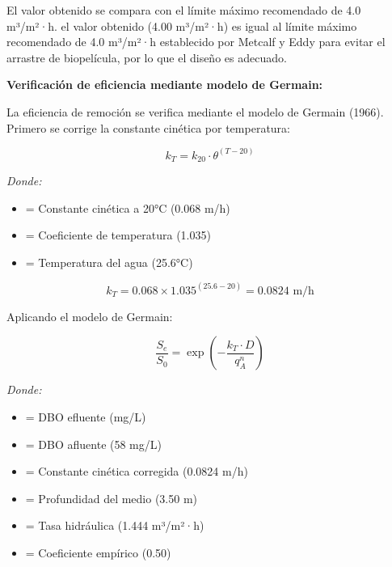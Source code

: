 \documentclass[12pt,a4paper]{article}
\begin{document}
El valor obtenido se compara con el límite máximo recomendado de 4.0 m³/m²·h. el valor obtenido (4.00 m³/m²·h) es igual al límite máximo recomendado de 4.0 m³/m²·h establecido por Metcalf y Eddy para evitar el arrastre de biopelícula, por lo que el diseño es adecuado.

\textbf{Verificación de eficiencia mediante modelo de Germain:}

La eficiencia de remoción se verifica mediante el modelo de Germain (1966). Primero se corrige la constante cinética por temperatura:

\begin{equation}
k_T = k_{20} \cdot \theta^{(T-20)}
\end{equation}

\textit{Donde:}
\begin{itemize}[noitemsep,leftmargin=2em]
    \item[$k_{20}$] = Constante cinética a 20°C (0.068 m/h)
    \item[$\theta$] = Coeficiente de temperatura (1.035)
    \item[$T$] = Temperatura del agua (25.6°C)
\end{itemize}

\begin{equation}
k_T = 0.068 \times 1.035^{(25.6-20)} = 0.0824 \text{ m/h}
\end{equation}

Aplicando el modelo de Germain:

\begin{equation}
\frac{S_e}{S_0} = \exp\left(-\frac{k_T \cdot D}{q_A^n}\right)
\end{equation}

\textit{Donde:}
\begin{itemize}[noitemsep,leftmargin=2em]
    \item[$S_e$] = DBO efluente (mg/L)
    \item[$S_0$] = DBO afluente (58 mg/L)
    \item[$k_T$] = Constante cinética corregida (0.0824 m/h)
    \item[$D$] = Profundidad del medio (3.50 m)
    \item[$q_A$] = Tasa hidráulica (1.444 m³/m²·h)
    \item[$n$] = Coeficiente empírico (0.50)
\end{itemize}
\end{document}
